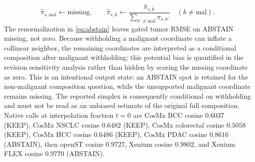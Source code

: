 \begin{equation}
\hat\pi_{s,\mathrm{mal}}\leftarrow\mathrm{missing},\qquad
\hat\pi_{s,k}\leftarrow\frac{\hat\pi_{s,k}}{\sum_{k'\neq\mathrm{mal}}\hat\pi_{s,k'}}\quad(k\neq\mathrm{mal}).
\label{eq:abstain}
\end{equation}
The renormalization in \eqref{eq:abstain} leaves gated tumor RMSE on ABSTAIN missing, not zero. Because withholding a malignant coordinate can inflate a collinear neighbor, the remaining coordinates are interpreted as a conditional composition after malignant withholding; this potential bias is quantified in the revision sensitivity analysis rather than hidden by scoring the missing coordinate as zero. This is an intentional output state: an ABSTAIN spot is retained for the non-malignant composition question, while the unsupported malignant coordinate remains missing. The reported simplex is consequently conditional on withholding and must not be read as an unbiased estimate of the original full composition. Native calls at interpolation fraction \(t=0\) are CosMx BCC cosine \(0.6037\) (KEEP), CosMx NSCLC cosine \(0.6482\) (KEEP), CosMx colorectal cosine \(0.5058\) (KEEP), CosMx HCC cosine \(0.6486\) (KEEP), CosMx PDAC cosine \(0.8616\) (ABSTAIN), then openST cosine \(0.9727\), Xenium cosine \(0.9802\), and Xenium FLEX cosine \(0.9770\) (ABSTAIN).

